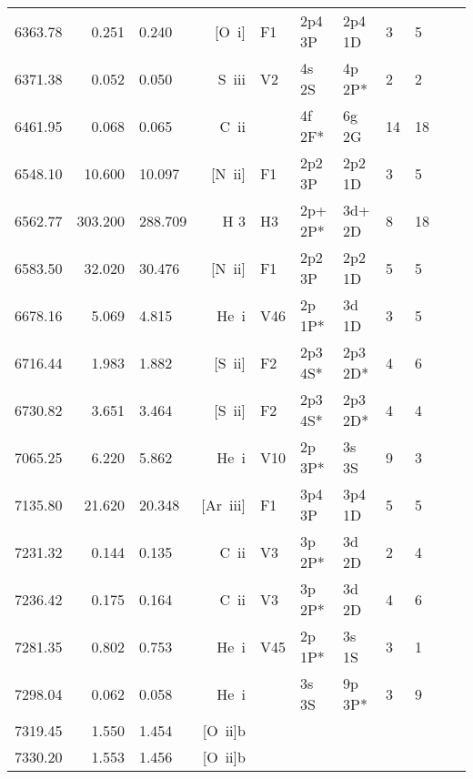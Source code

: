 \begin{longtable}{lrlrlllllll}
 6363.78 &   0.251 &   0.240 &  [O~{\sc i}]     &  F1        &  2p4 3P    &  2p4 1D    &          3 &        5    \\
 6371.38 &   0.052 &   0.050 &  S~{\sc iii}     &  V2        &  4s 2S     &  4p 2P*    &          2 &        2    \\
 6461.95 &   0.068 &   0.065 &  C~{\sc ii}      &            &  4f 2F*    &  6g 2G     &         14 &       18    \\
 6548.10 &  10.600 &  10.097 &  [N~{\sc ii}]    &  F1        &  2p2 3P    &  2p2 1D    &          3 &        5    \\
 6562.77 & 303.200 & 288.709 &  H 3       &  H3        &  2p+ 2P*   &  3d+ 2D    &          8 &       18          \\
 6583.50 &  32.020 &  30.476 &  [N~{\sc ii}]    &  F1        &  2p2 3P    &  2p2 1D    &          5 &        5    \\
 6678.16 &   5.069 &   4.815 &  He~{\sc i}      &  V46       &  2p 1P*    &  3d 1D     &          3 &        5    \\
 6716.44 &   1.983 &   1.882 &  [S~{\sc ii}]    &  F2        &  2p3 4S*   &  2p3 2D*   &          4 &        6    \\
 6730.82 &   3.651 &   3.464 &  [S~{\sc ii}]    &  F2        &  2p3 4S*   &  2p3 2D*   &          4 &        4    \\
 7065.25 &   6.220 &   5.862 &  He~{\sc i}      &  V10       &  2p 3P*    &  3s 3S     &          9 &        3    \\
 7135.80 &  21.620 &  20.348 &  [Ar~{\sc iii}]  &  F1        &  3p4 3P    &  3p4 1D    &          5 &        5    \\
 7231.32 &   0.144 &   0.135 &  C~{\sc ii}      &  V3        &  3p 2P*    &  3d 2D     &          2 &        4    \\
 7236.42 &   0.175 &   0.164 &  C~{\sc ii}      &  V3        &  3p 2P*    &  3d 2D     &          4 &        6    \\
 7281.35 &   0.802 &   0.753 &  He~{\sc i}      &  V45       &  2p 1P*    &  3s 1S     &          3 &        1    \\
 7298.04 &   0.062 &   0.058 &  He~{\sc i}      &            &  3s 3S     &  9p 3P*    &          3 &        9    \\
 7319.45 &   1.550 &   1.454 & [O~{\sc ii}]b                                                                      \\
 7330.20 &   1.553 &   1.456 & [O~{\sc ii}]b                                                                      \\

\end{longtable}

